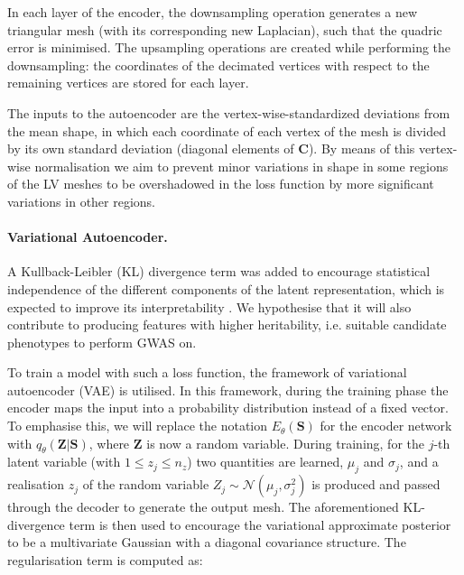 In each layer of the encoder, the downsampling operation generates a new triangular mesh (with its corresponding new Laplacian), such that the quadric error is minimised. The upsampling operations are created while performing the downsampling: the coordinates of the decimated vertices with respect to the remaining vertices are stored for each layer. 

The inputs to the autoencoder are the vertex-wise-standardized deviations from the mean shape, in which each coordinate of each vertex of the mesh is divided by its own standard deviation (diagonal elements of $\textbf{C}$). By means of this vertex-wise normalisation we aim to prevent minor variations in shape in some regions of the LV meshes to be overshadowed in the loss function by more significant variations in other regions. 

\paragraph{Variational Autoencoder.} A Kullback-Leibler (KL) divergence term was added to encourage statistical independence of the different components of the latent representation, which is expected to improve its interpretability \cite{ref_betavae}. We hypothesise that it will also contribute to producing features with higher heritability, i.e. suitable candidate phenotypes to perform GWAS on.

To train a model with such a loss function, the framework of variational autoencoder (VAE) is utilised. In this framework, during the training phase the encoder maps the input into a probability distribution instead of a fixed vector. To emphasise this, we will replace the notation $E_\theta(\textbf{S})$ for the encoder network with $q_{\theta}(\textbf{Z}|\textbf{S})$, where $\textbf{Z}$ is now a random variable. During training, for the $j$-th latent variable (with $1\leq z_j\leq n_z$) two quantities are learned, $\mu_j$ and $\sigma_j$, and a realisation $z_j$ of the random variable $Z_j\sim\mathcal{N}(\mu_j, \sigma^2_j)$ is produced and passed through the decoder to generate the output mesh. The aforementioned KL-divergence term is then used to encourage the variational approximate posterior to be a multivariate Gaussian with a diagonal covariance structure. The regularisation term is computed as:

